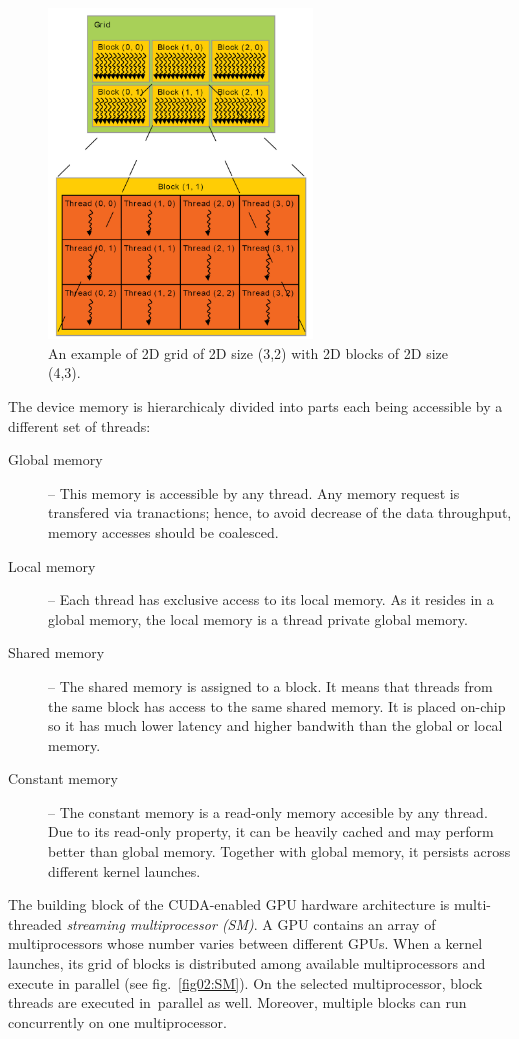 \begin{figure}\centering
	\includegraphics[width=7cm]{img/grid}
	\caption{An example of 2D grid of 2D size (3,2) with 2D blocks of 2D size (4,3).}
	\label{fig02:grid}
\end{figure}


The device memory is hierarchicaly divided into parts each being accessible by a different set of threads:

\begin{description}
	\item[Global memory] -- This memory is accessible by any thread. Any memory request is transfered via tranactions; hence, to avoid decrease of the data throughput, memory accesses should be coalesced. 
	\item[Local memory] -- Each thread has exclusive access to its local memory. As it resides in a global memory, the local memory is a thread private global memory.
	\item[Shared memory] -- The shared memory is assigned to a block. It means that threads from the same block has access to the same shared memory. It is placed on-chip so it has much lower latency and higher bandwith than the global or local memory.
	\item[Constant memory] -- The constant memory is a read-only memory accesible by any thread. Due to its read-only property, it can be heavily cached and may perform better than global memory. Together with global memory, it persists across different kernel launches.
\end{description}

The building block of the CUDA-enabled GPU hardware architecture is multi-threaded \emph{streaming multiprocessor (SM)}. A GPU contains an array of multiprocessors whose number varies between different GPUs. When a kernel launches, its grid of blocks is distributed among available multiprocessors and execute in parallel (see fig.~\ref{fig02:SM}). On the selected multiprocessor, block threads are executed in~parallel as well. Moreover, multiple blocks can run concurrently on one multiprocessor.

